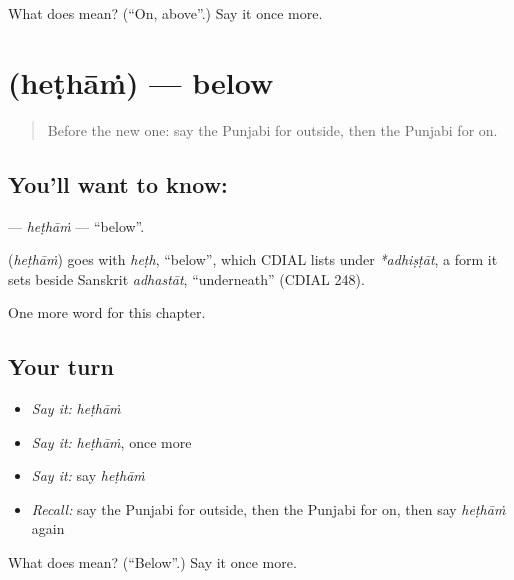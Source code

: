 \begin{tcolorbox}[breakable,colback=teal!4,colframe=teal!35!black,title={Before you move on}]
What does  mean? (\textquotedblleft{}On, above\textquotedblright{}.) Say it once more.
\end{tcolorbox}
\section[\texorpdfstring{\pa{ਹੇਠਾਂ} (heṭhāṁ)}{ਹੇਠਾਂ (heṭhāṁ)}]{ (heṭhāṁ) — below}

\label{lesson:PA-C88-hetham}



\begin{quote}
Before the new one: say the Punjabi for outside, then the Punjabi for on.
\end{quote}

\subsection*{You'll want to know: }
\textbf{} — \emph{heṭhāṁ} — \textquotedblleft{}below\textquotedblright{}.

\begin{cousinweb}
\textbf{} (\emph{heṭhāṁ}) goes with \emph{heṭh}, \textquotedblleft{}below\textquotedblright{}, which CDIAL lists under \emph{*adhiṣṭāt}, a form it sets beside Sanskrit \emph{adhastāt}, \textquotedblleft{}underneath\textquotedblright{} (CDIAL 248).
\end{cousinweb}

\begin{grammarlens}[title={What you've built}]
One more word for this chapter.
\end{grammarlens}

\subsection*{Your turn}
\begin{itemize}
\raggedright
  \item \emph{Say it:} \emph{heṭhāṁ}
  \item \emph{Say it:} \emph{heṭhāṁ}, once more
  \item \emph{Say it:} say \emph{heṭhāṁ}
  \item \emph{Recall:} say the Punjabi for outside, then the Punjabi for on, then say \emph{heṭhāṁ} again
\end{itemize}

\begin{tcolorbox}[breakable,colback=teal!4,colframe=teal!35!black,title={Before you move on}]
What does  mean? (\textquotedblleft{}Below\textquotedblright{}.) Say it once more.
\end{tcolorbox}
